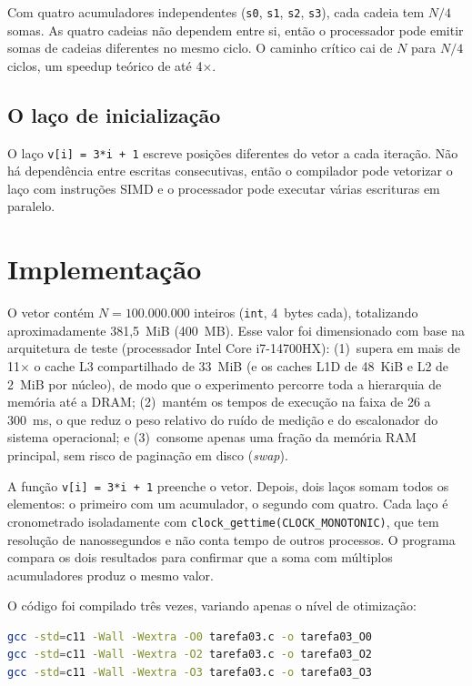 \documentclass[11pt,letterpaper]{article}
\begin{document}
Com quatro acumuladores independentes (\texttt{s0}, \texttt{s1}, \texttt{s2},
\texttt{s3}), cada cadeia tem $N/4$ somas. As quatro cadeias não dependem entre
si, então o processador pode emitir somas de cadeias diferentes no mesmo ciclo.
O caminho crítico cai de $N$ para $N/4$ ciclos, um speedup teórico de até 4$\times$.

\subsection{O laço de inicialização}
O laço \texttt{v[i] = 3*i + 1} escreve posições diferentes do vetor a cada
iteração. Não há dependência entre escritas consecutivas, então o compilador
pode vetorizar o laço com instruções SIMD e o processador pode executar várias
escrituras em paralelo.

\newpage
\section{Implementação}

O vetor contém $N=100.000.000$ inteiros (\texttt{int}, 4~bytes cada), totalizando
aproximadamente 381,5~MiB (400~MB). Esse valor foi dimensionado com base na
arquitetura de teste (processador Intel Core i7-14700HX):
(1)~supera em mais de 11$\times$ o cache L3 compartilhado de 33~MiB (e os caches
L1D de 48~KiB e L2 de 2~MiB por núcleo), de modo que o experimento percorre
toda a hierarquia de memória até a DRAM;
(2)~mantém os tempos de execução na faixa de 26 a 300~ms, o que reduz o peso
relativo do ruído de medição e do escalonador do sistema operacional; e
(3)~consome apenas uma fração da memória RAM principal, sem risco de
paginação em disco (\textit{swap}).

A função \texttt{v[i] = 3*i + 1} preenche o vetor. Depois, dois laços
somam todos os elementos: o primeiro com um acumulador, o segundo com quatro.
Cada laço é cronometrado isoladamente com
\texttt{clock\_gettime(CLOCK\_MONOTONIC)}, que tem resolução de nanossegundos e
não conta tempo de outros processos. O programa compara os dois resultados para
confirmar que a soma com múltiplos acumuladores produz o mesmo valor.



O código foi compilado três vezes, variando apenas o nível de otimização:
\begin{lstlisting}[language=bash]
gcc -std=c11 -Wall -Wextra -O0 tarefa03.c -o tarefa03_O0
gcc -std=c11 -Wall -Wextra -O2 tarefa03.c -o tarefa03_O2
gcc -std=c11 -Wall -Wextra -O3 tarefa03.c -o tarefa03_O3
\end{lstlisting}
\end{document}
